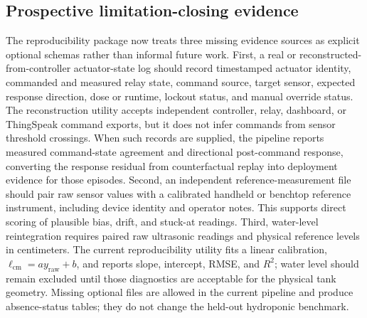 \documentclass[preprint,12pt,doubleblind]{elsarticle}
\begin{document}
\subsection{Prospective limitation-closing evidence}
The reproducibility package now treats three missing evidence sources as explicit optional schemas rather than informal future work. First, a real or reconstructed-from-controller actuator-state log should record timestamped actuator identity, commanded and measured relay state, command source, target sensor, expected response direction, dose or runtime, lockout status, and manual override status. The reconstruction utility accepts independent controller, relay, dashboard, or ThingSpeak command exports, but it does not infer commands from sensor threshold crossings. When such records are supplied, the pipeline reports measured command-state agreement and directional post-command response, converting the response residual from counterfactual replay into deployment evidence for those episodes. Second, an independent reference-measurement file should pair raw sensor values with a calibrated handheld or benchtop reference instrument, including device identity and operator notes. This supports direct scoring of plausible bias, drift, and stuck-at readings. Third, water-level reintegration requires paired raw ultrasonic readings and physical reference levels in centimeters. The current reproducibility utility fits a linear calibration, $\ell_{\mathrm{cm}}=a y_{\mathrm{raw}}+b$, and reports slope, intercept, RMSE, and $R^2$; water level should remain excluded until those diagnostics are acceptable for the physical tank geometry. Missing optional files are allowed in the current pipeline and produce absence-status tables; they do not change the held-out hydroponic benchmark.

\begin{table}[!htbp]
\centering
\caption{Evidence status for the current revision. The table separates available deployment evidence from prospective evidence needed to convert replay checks into measured closed-loop actuator-response claims.}
\label{tab:evidence_status}
\footnotesize
{}
\end{table}
\end{document}
